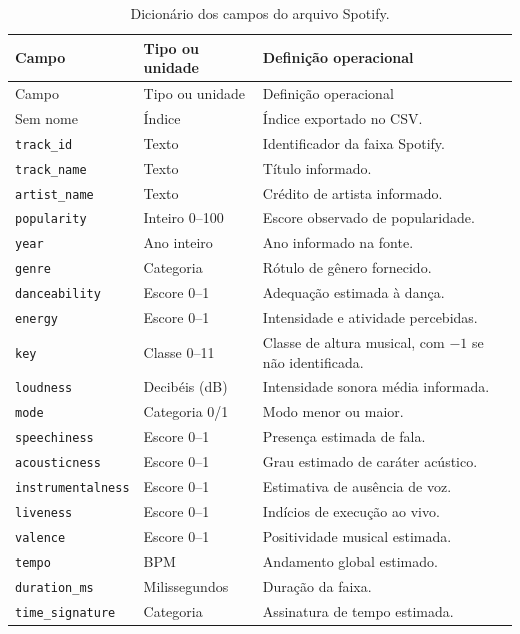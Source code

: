 \begingroup\footnotesize\singlespacing
\begin{longtable}{@{}P{.26\linewidth}P{.20\linewidth}P{.48\linewidth}@{}}
\caption{Dicionário dos campos do arquivo Spotify.}\label{tab:dicionario}\\
\toprule Campo & Tipo ou unidade & Definição operacional \\\midrule\endfirsthead
\toprule Campo & Tipo ou unidade & Definição operacional \\\midrule\endhead
\bottomrule\endfoot
\bottomrule\endlastfoot
Sem nome & Índice & Índice exportado no CSV. \\
\texttt{track\_id} & Texto & Identificador da faixa Spotify. \\
\texttt{track\_name} & Texto & Título informado. \\
\texttt{artist\_name} & Texto & Crédito de artista informado. \\
\texttt{popularity} & Inteiro 0--100 & Escore observado de popularidade. \\
\texttt{year} & Ano inteiro & Ano informado na fonte. \\
\texttt{genre} & Categoria & Rótulo de gênero fornecido. \\
\texttt{danceability} & Escore 0--1 & Adequação estimada à dança. \\
\texttt{energy} & Escore 0--1 & Intensidade e atividade percebidas. \\
\texttt{key} & Classe 0--11 & Classe de altura musical, com $-1$ se não identificada. \\
\texttt{loudness} & Decibéis (dB) & Intensidade sonora média informada. \\
\texttt{mode} & Categoria 0/1 & Modo menor ou maior. \\
\texttt{speechiness} & Escore 0--1 & Presença estimada de fala. \\
\texttt{acousticness} & Escore 0--1 & Grau estimado de caráter acústico. \\
\texttt{instrumentalness} & Escore 0--1 & Estimativa de ausência de voz. \\
\texttt{liveness} & Escore 0--1 & Indícios de execução ao vivo. \\
\texttt{valence} & Escore 0--1 & Positividade musical estimada. \\
\texttt{tempo} & BPM & Andamento global estimado. \\
\texttt{duration\_ms} & Milissegundos & Duração da faixa. \\
\texttt{time\_signature} & Categoria & Assinatura de tempo estimada. \\
\end{longtable}
\endgroup

